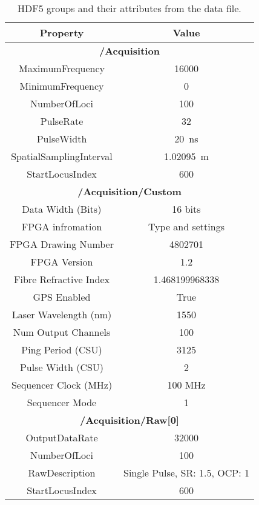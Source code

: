 \begin{table}[h]
    \centering
    \begin{tabular}{|c|c|}
    \hline
        \textbf{Property} & \textbf{Value} \\ \hline
    \multicolumn{2}{|c|}{\textbf{/Acquisition}} \\ \hline
        MaximumFrequency & 16000 \\ \hline
        MinimumFrequency & 0 \\ \hline
        NumberOfLoci & 100 \\ \hline
        PulseRate & \qty{32}{} \\ \hline
        PulseWidth & \qty{20}{\ns} \\ \hline
        SpatialSamplingInterval & \qty{1.02095}{\meter} \\ \hline
        StartLocusIndex & 600 \\ \hline
    \multicolumn{2}{|c|}{\textbf{/Acquisition/Custom}} \\ \hline
        Data Width (Bits) & 16 bits \\ \hline
        FPGA infromation & Type and settings \\ \hline
        FPGA Drawing Number & 4802701 \\ \hline
        FPGA Version & 1.2 \\ \hline
        Fibre Refractive Index & 1.468199968338 \\ \hline
        GPS Enabled & True \\ \hline
        Laser Wavelength (nm) & 1550 \\ \hline
        Num Output Channels & 100 \\ \hline
        Ping Period (CSU) & 3125 \\ \hline
        Pulse Width (CSU) & 2 \\ \hline
        Sequencer Clock (MHz) & 100 MHz \\ \hline
        Sequencer Mode & 1 \\ \hline
    \multicolumn{2}{|c|}{\textbf{/Acquisition/Raw[0]}} \\ \hline
        OutputDataRate & 32000  \\ \hline
        NumberOfLoci & 100  \\ \hline
        RawDescription & Single Pulse, SR: 1.5, OCP: 1  \\ \hline
        StartLocusIndex & 600  \\ \hline

    \end{tabular}
    \caption{HDF5 groups and their attributes from the data file.}
    \label{tab:file_details}
\end{table}
